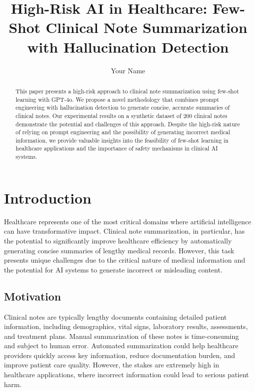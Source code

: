 \documentclass[sigconf]{acmart}
\begin{document}
\title{High-Risk AI in Healthcare: Few-Shot Clinical Note Summarization with Hallucination Detection}

\author{Your Name}

\begin{abstract}
This paper presents a high-risk approach to clinical note summarization using few-shot learning with GPT-4o. We propose a novel methodology that combines prompt engineering with hallucination detection to generate concise, accurate summaries of clinical notes. Our experimental results on a synthetic dataset of 200 clinical notes demonstrate the potential and challenges of this approach. Despite the high-risk nature of relying on prompt engineering and the possibility of generating incorrect medical information, we provide valuable insights into the feasibility of few-shot learning in healthcare applications and the importance of safety mechanisms in clinical AI systems.
\end{abstract}

\maketitle

\section{Introduction}

Healthcare represents one of the most critical domains where artificial intelligence can have transformative impact. Clinical note summarization, in particular, has the potential to significantly improve healthcare efficiency by automatically generating concise summaries of lengthy medical records. However, this task presents unique challenges due to the critical nature of medical information and the potential for AI systems to generate incorrect or misleading content.

\subsection{Motivation}

Clinical notes are typically lengthy documents containing detailed patient information, including demographics, vital signs, laboratory results, assessments, and treatment plans. Manual summarization of these notes is time-consuming and subject to human error. Automated summarization could help healthcare providers quickly access key information, reduce documentation burden, and improve patient care quality. However, the stakes are extremely high in healthcare applications, where incorrect information could lead to serious patient harm.
\end{document}
